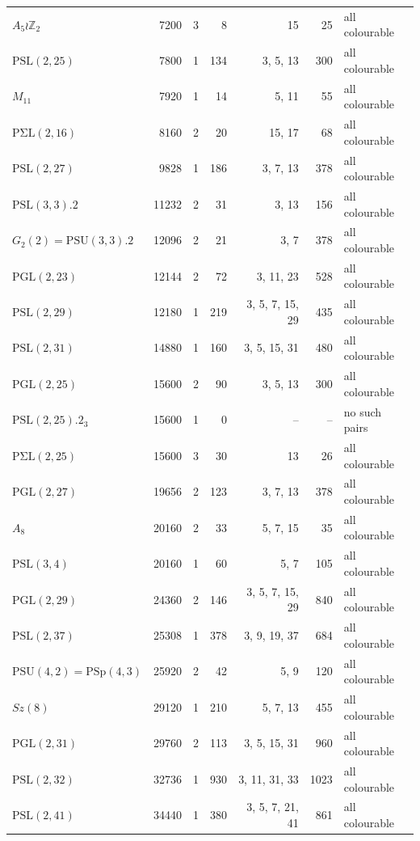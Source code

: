 \begin{tabular}{@{}lrrrrrl@{}}
$A_5\wr\mathbb{Z}_2$ & 7200 & 3 & 8 & 15 & 25 & all colourable\\
$\mathrm{PSL}(2,25)$ & 7800 & 1 & 134 & 3, 5, 13 & 300 & all colourable\\
$M_{11}$ & 7920 & 1 & 14 & 5, 11 & 55 & all colourable\\
$\mathrm{P\Sigma L}(2,16)$ & 8160 & 2 & 20 & 15, 17 & 68 & all colourable\\
$\mathrm{PSL}(2,27)$ & 9828 & 1 & 186 & 3, 7, 13 & 378 & all colourable\\
$\mathrm{PSL}(3,3).2$ & 11232 & 2 & 31 & 3, 13 & 156 & all colourable\\
$G_2(2)=\mathrm{PSU}(3,3).2$ & 12096 & 2 & 21 & 3, 7 & 378 & all colourable\\
$\mathrm{PGL}(2,23)$ & 12144 & 2 & 72 & 3, 11, 23 & 528 & all colourable\\
$\mathrm{PSL}(2,29)$ & 12180 & 1 & 219 & 3, 5, 7, 15, 29 & 435 & all colourable\\
$\mathrm{PSL}(2,31)$ & 14880 & 1 & 160 & 3, 5, 15, 31 & 480 & all colourable\\
$\mathrm{PGL}(2,25)$ & 15600 & 2 & 90 & 3, 5, 13 & 300 & all colourable\\
$\mathrm{PSL}(2,25).2_3$ & 15600 & 1 & 0 & -- & -- & no such pairs\\
$\mathrm{P\Sigma L}(2,25)$ & 15600 & 3 & 30 & 13 & 26 & all colourable\\
$\mathrm{PGL}(2,27)$ & 19656 & 2 & 123 & 3, 7, 13 & 378 & all colourable\\
$A_8$ & 20160 & 2 & 33 & 5, 7, 15 & 35 & all colourable\\
$\mathrm{PSL}(3,4)$ & 20160 & 1 & 60 & 5, 7 & 105 & all colourable\\
$\mathrm{PGL}(2,29)$ & 24360 & 2 & 146 & 3, 5, 7, 15, 29 & 840 & all colourable\\
$\mathrm{PSL}(2,37)$ & 25308 & 1 & 378 & 3, 9, 19, 37 & 684 & all colourable\\
$\mathrm{PSU}(4,2)=\mathrm{PSp}(4,3)$ & 25920 & 2 & 42 & 5, 9 & 120 & all colourable\\
$Sz(8)$ & 29120 & 1 & 210 & 5, 7, 13 & 455 & all colourable\\
$\mathrm{PGL}(2,31)$ & 29760 & 2 & 113 & 3, 5, 15, 31 & 960 & all colourable\\
$\mathrm{PSL}(2,32)$ & 32736 & 1 & 930 & 3, 11, 31, 33 & 1023 & all colourable\\
$\mathrm{PSL}(2,41)$ & 34440 & 1 & 380 & 3, 5, 7, 21, 41 & 861 & all colourable\\

\end{tabular}
